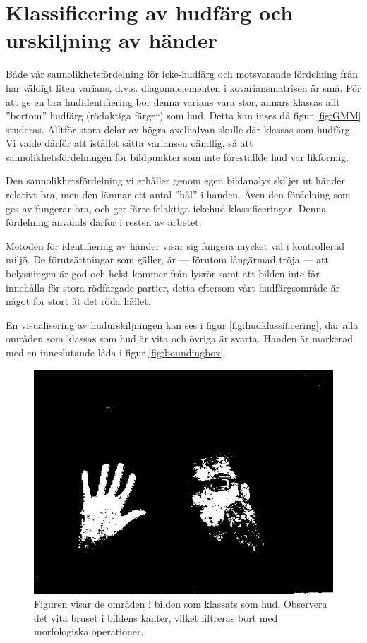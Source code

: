 \documentclass[../rapport_MVEX01-11-05]{subfiles}
\begin{document}
\section{Klassificering av hudfärg och urskiljning av händer}
Både vår sannolikhetsfördelning för icke-hudfärg och motsvarande
fördelning från  har väldigt liten varians,
d.v.s. diagonalelementen i kovariansmatrisen är små. För att ge en bra
hudidentifiering bör denna varians vara stor, annars klassas allt
''bortom'' hudfärg (rödaktiga färger) som hud.
Detta kan inses då figur \vref{fig:GMM} studeras. Alltför stora delar av högra
axelhalvan skulle där klassas som hudfärg. Vi valde därför att
istället sätta variansen oändlig, så att sannolikhetsfördelningen för
bildpunkter som inte föreställde hud var likformig.

Den sannolikhetsfördelning vi erhåller genom egen bildanalys skiljer
ut händer relativt bra, men den lämnar ett antal ''hål'' i handen. Även
den fördelning som ges av  fungerar bra, och
ger färre felaktiga ickehud-klassificeringar.
Denna fördelning används därför
i resten av arbetet. 

Metoden för identifiering av händer visar sig fungera mycket väl i
kontrollerad miljö. De förutsättningar som gäller, är --- förutom långärmad
tröja --- att belysningen är god och helst kommer från lysrör
samt att bilden inte får innehålla för stora rödfärgade partier, detta
eftersom vårt hudfärgsområde är något för stort åt det röda hållet. 

En visualisering av hudurskiljningen kan ses i figur
\vref{fig:hudklassificering}, där alla områden som klassas som hud
är vita och övriga är svarta. Handen är markerad med en inneslutande
låda i figur \vref{fig:boundingbox}.

\begin{figure}
  \centering
  \includegraphics[width=0.9\columnwidth]{bilder/whiteskin}
  \caption{Figuren visar de områden i bilden som klassats som hud.
  Observera det vita bruset i bildens kanter, vilket filtreras bort med
  morfologiska operationer.}
  \label{fig:hudklassificering}
\end{figure}
\end{document}
